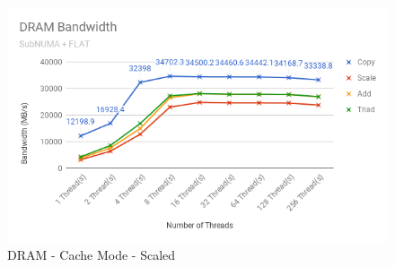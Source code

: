 \documentclass[bsc,frontabs,twoside,singlespacing,parskip,deptreport]{infthesis}     %
\begin{document}
\begin{figure}[!h]
    \centering
    \includegraphics[width=\textwidth]{Results/dram_snc4_f_scaled.png}
    \caption{DRAM - Cache Mode - Scaled}
    \label{res:dram-snc4-f-scaled}
\end{figure}
\end{document}
